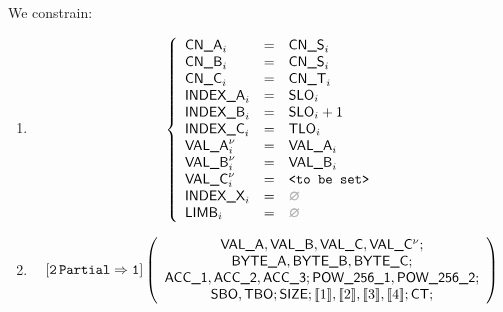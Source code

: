 \begin{center}
\end{center}

We constrain:
\begin{enumerate}
	\item 
\[
	\left\{
	\begin{array}{lclr}
		\cnA      _{i}       & = & \cnS_{i}            \\
		\cnB      _{i}       & = & \cnS_{i}            \\
		\cnC      _{i}       & = & \cnT_{i}            \\
		\indexA   _{i}       & = & \slo_{i}            \\
		\indexB   _{i}       & = & \slo_{i} + 1        \\
		\indexC   _{i}       & = & \tlo_{i}            \\
		\valA     _{i}\new{} & = & \valA_{i}           \\
		\valB     _{i}\new{} & = & \valB_{i}           \\
		\valC     _{i}\new{} & = & \valueToBeSet       \\
		\indexX   _{i}       & = & \nothing            \\
		\limb     _{i}       & = & \nothing            \\
	\end{array}
	\right.
\]
	\item 
\[
	\twoPartialToOne
	\left(
	\begin{array}{c}
	\valA{}, \valB{}, \valC{}, \valC{}\new{};\\
	\BYTEA{}, \BYTEB{}, \BYTEC{};\\
	\acc{1}, \acc{2}, \acc{3}; \pow{1}, \pow{2}; \\
	\sbo{}, \tbo{}; \size{}; \bit{1}, \bit{2}, \bit{3}, \bit{4}; \ct{};
	\end{array}
	\right)
\]

\end{enumerate}
